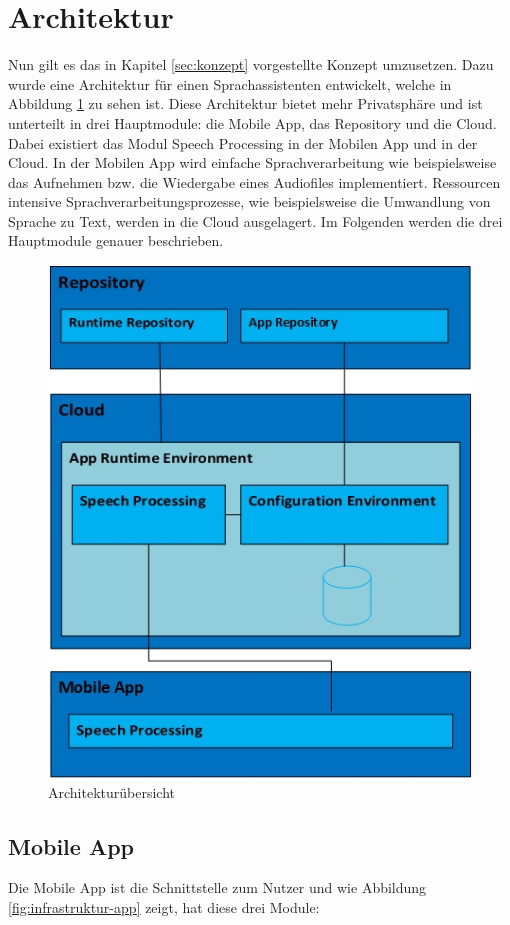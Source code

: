 \section{Architektur}\label{sec:architecure}
Nun gilt es das in Kapitel \ref{sec:konzept} vorgestellte Konzept umzusetzen. Dazu wurde eine Architektur für einen Sprachassistenten entwickelt, welche in Abbildung \ref{fig:infrastruktur-overview} zu sehen ist. Diese Architektur bietet mehr Privatsphäre und ist unterteilt in drei Hauptmodule: die Mobile App, das Repository und die Cloud. Dabei existiert das Modul \glqq Speech Processing\grqq{} in der Mobilen App und in der Cloud. In der Mobilen App wird einfache Sprachverarbeitung wie beispielsweise das Aufnehmen bzw. die Wiedergabe eines Audiofiles implementiert. Ressourcen intensive Sprachverarbeitungsprozesse, wie beispielsweise die Umwandlung von Sprache zu Text, werden in die Cloud ausgelagert. Im Folgenden werden die drei Hauptmodule genauer beschrieben.
\begin{figure}[h!]
	\centering
	\includegraphics[width=0.8\linewidth]{Picture/Infrastruktur-Overview.jpg}
	\caption[Architekturübersicht]{Architekturübersicht}
	\label{fig:infrastruktur-overview}
\end{figure}

\subsection{Mobile App}
Die Mobile App ist die Schnittstelle zum Nutzer und wie Abbildung \ref{fig:infrastruktur-app} zeigt, hat diese drei Module:

